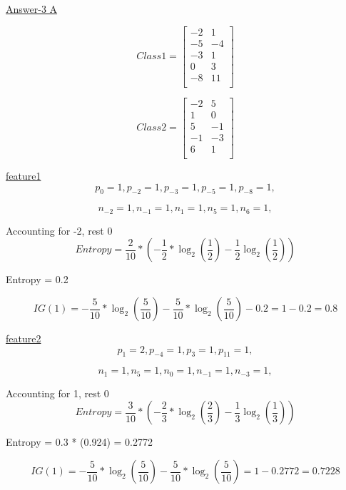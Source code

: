 \documentclass{report}
\begin{document}
\begin{flushleft}
\underline {Answer-3 A}  \linebreak[2]

\begin{equation} 
Class 1 = 
\begin{bmatrix}
-2 & 1 \\
-5 & -4 \\
-3 & 1 \\
0 &	3 \\
-8 & 11 \\
\end{bmatrix}
\end{equation}

\begin{equation} 
Class 2 = 
\begin{bmatrix}
-2 & 5 \\
1 & 0 \\
5 & -1 \\
-1 & -3 \\
6 & 1 \\
\end{bmatrix}
\end{equation}

\underline{feature1} 
\[p_0 = 1 ,
p_{-2} = 1 ,
p_{-3} = 1 ,
p_{-5} = 1 ,
p_{-8} = 1 , 
\] 

\[n_{-2} = 1 ,
n_{-1} = 1 ,
n_{1} = 1 ,
n_{5} = 1 ,
n_{6} = 1 , 
\]

Accounting for -2, rest 0
\[
Entropy = \frac{2}{10}*(-\frac{1}{2}*\log_2(\frac{1}{2}) - \frac{1}{2}\log_2(\frac{1}{2})) 
\] 

Entropy = 0.2

\begin{equation}
IG(1) =  -\frac{5}{10}*\log_2(\frac{5}{10})-\frac{5}{10}*\log_2(\frac{5}{10}) -0.2  = 1 - 0.2 = 0.8
\end{equation}

\underline{feature2} 
\[p_1 = 2 ,
p_{-4} = 1 ,
p_{3} = 1 ,
p_{11} = 1 ,
\] 

\[n_{1} = 1 ,
n_{5} = 1 ,
n_{0} = 1 ,
n_{-1} = 1 ,
n_{-3} = 1 , 
\]

Accounting for 1, rest 0
\[
Entropy = \frac{3}{10}*(-\frac{2}{3}*\log_2(\frac{2}{3}) - \frac{1}{3}\log_2(\frac{1}{3})) 
\] 

Entropy = 0.3 * (0.924) = 0.2772

\begin{equation}
IG(1) =  -\frac{5}{10}*\log_2(\frac{5}{10})-\frac{5}{10}*\log_2(\frac{5}{10})  = 1 - 0.2772 = 0.7228
\end{equation}



\end{flushleft}
\end{document}

